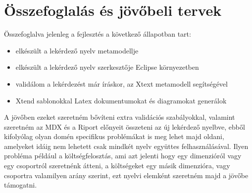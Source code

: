 \chapter{Összefoglalás és jövőbeli tervek}\label{sect:Summary}
Összefoglalva jelenleg a fejlesztés a következő állapotban tart:
\begin{itemize}
  \item elkészült a lekérdező nyelv metamodellje
  \item elkészült a lekérdező nyelv szerkesztője Eclipse környezetben
  \item validálom a lekérdezést már íráskor, az Xtext metamodell segítségével
  \item Xtend sablonokkal Latex dokumentumokat és diagramokat generálok
\end{itemize}

A jövőben ezeket szeretném bővíteni extra validációs szabályokkal, valamint szeretném az MDX és a Riport előnyeit összeteni az új lekérdező nyelbve, ebből kifolyólag olyan domén specifikus problémákat is meg lehet majd oldani, amelyeket idáig nem lehetett csak mindkét nyelv együttes felhasználásával. Ilyen probléma például a költségfelosztás, ami azt jelenti hogy egy dimenzióról vagy egy csoportról szeretnénk átteni, a költségeket egy másik dimenzióra, vagy csoportra valamilyen arány szerint, ezt nyelvi elemként szeretném majd a jövőbe támogatni.
